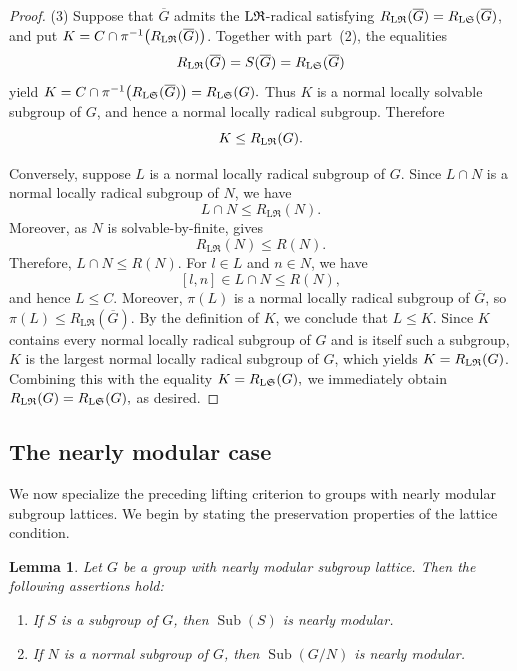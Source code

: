 \documentclass[11pt, reqno]{amsart}
\numberwithin{equation}{section}
\newtheorem{lemma}[theorem]{Lemma}
\theoremstyle{definition}
\numberwithin{equation}{section}
\begin{document}
\begin{proof}
\medskip
(3) Suppose that $\overline G$ admits the $\textup{L}\mathfrak{R}$-radical satisfying $R_{\textup{L}\mathfrak R}(\overline G)=R_{\textup{L}\mathfrak S}(\overline G)$, and put $K=C\cap \pi^{-1}\bigl(R_{\textup{L}\mathfrak R}(\overline G)\bigr)$. 
Together with part~\textup{(2)}, the equalities
$$R_{\textup{L}\mathfrak R}(\overline G) = S(\overline G) = R_{\textup{L}\mathfrak S}(\overline G)$$ yield $K = C\cap \pi^{-1}\bigl(R_{\textup{L}\mathfrak S}(\overline G)\bigr) = R_{\textup{L}\mathfrak S}(G).$ 
Thus $K$ is a normal locally solvable subgroup of $G$, and hence a normal locally radical subgroup. 
Therefore $$K\leq R_{\textup{L}\mathfrak R}(G).$$

Conversely, suppose $L$ is a normal locally radical subgroup of $G$. 
Since $L\cap N$ is a normal locally radical subgroup of $N$, we have
$$L\cap N\leq R_{\mathrm{L}\mathfrak{R}}(N).$$
Moreover, as $N$ is solvable-by-finite, \cite[Lemma~2.5 and Theorem~2.6]{CNH2025} gives
$$R_{\mathrm{L}\mathfrak{R}}(N)\leq R(N).$$
Therefore, $L\cap N\leq R(N).$ For $l\in L$ and $n\in N$, we have
$$[l,n]\in L\cap N\leq R(N),$$
and hence $L\leq C$. 
Moreover, $\pi(L)$ is a normal locally radical subgroup of $\overline{G}$, so $\pi(L)\leq R_{\mathrm{L}\mathfrak{R}}(\overline{G}).$ 
By the definition of $K$, we conclude that $L\leq K$.
Since $K$ contains every normal locally radical subgroup of $G$ and is itself such a subgroup, $K$ is the largest normal locally radical subgroup of $G$, which yields $K=R_{\textup{L}\mathfrak R}(G)$. 
Combining this with the equality $K=R_{\textup{L}\mathfrak S}(G),$ we immediately obtain
$R_{\textup{L}\mathfrak R}(G) = R_{\textup{L}\mathfrak S}(G),$ as desired.
\end{proof}

\subsection{The nearly modular case} \hfill

\medskip
We now specialize the preceding lifting criterion to groups with nearly modular subgroup lattices. We begin by stating the preservation properties of the lattice condition.

\begin{lemma}\label{lem:modularpreserve}
Let $G$ be a group with nearly modular subgroup lattice. Then the following assertions hold:
\begin{enumerate}[label=\textup{(\arabic*)}]
    \item If $S$ is a subgroup of $G$, then  $\operatorname{Sub}(S)$ is nearly modular.
    \item If $N$ is a normal subgroup of $G$, then $\operatorname{Sub}(G/N)$ is nearly modular.
\end{enumerate}
\end{lemma}
    
\end{document}

